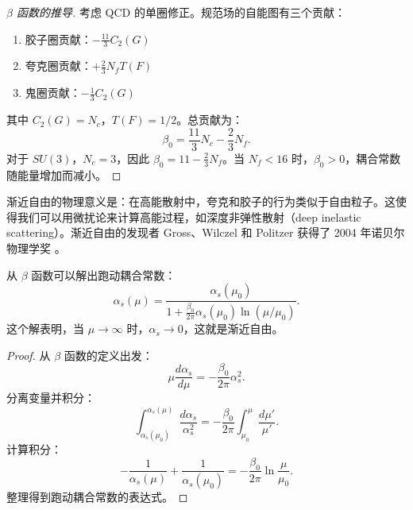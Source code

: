 \begin{proof}[$\beta$ 函数的推导]
考虑 QCD 的单圈修正。规范场的自能图有三个贡献：
\begin{enumerate}
    \item 胶子圈贡献：$-\frac{11}{3}C_2(G)$
    \item 夸克圈贡献：$+\frac{2}{3}N_f T(F)$
    \item 鬼圈贡献：$-\frac{1}{3}C_2(G)$
\end{enumerate}
其中 $C_2(G) = N_c$，$T(F) = 1/2$。总贡献为：
\begin{equation}
    \beta_0 = \frac{11}{3}N_c - \frac{2}{3}N_f.
\end{equation}
对于 $SU(3)$，$N_c = 3$，因此 $\beta_0 = 11 - \frac{2}{3}N_f$。当 $N_f < 16$ 时，$\beta_0 > 0$，耦合常数随能量增加而减小。
\end{proof}

\begin{remark}
渐近自由的物理意义是：在高能散射中，夸克和胶子的行为类似于自由粒子。这使得我们可以用微扰论来计算高能过程，如深度非弹性散射（deep inelastic scattering）。渐近自由的发现者 Gross、Wilczel 和 Politzer 获得了 2004 年诺贝尔物理学奖 \cite{Gross1973, Politzer1973}。
\end{remark}

\begin{proposition}[跑动耦合常数]
从 $\beta$ 函数可以解出跑动耦合常数：
\begin{equation}
    \alpha_s(\mu) = \frac{\alpha_s(\mu_0)}{1 + \frac{\beta_0}{2\pi}\alpha_s(\mu_0)\ln(\mu/\mu_0)}.
\end{equation}
这个解表明，当 $\mu \to \infty$ 时，$\alpha_s \to 0$，这就是渐近自由。
\end{proposition}

\begin{proof}
从 $\beta$ 函数的定义出发：
\begin{equation}
    \mu \frac{d\alpha_s}{d\mu} = -\frac{\beta_0}{2\pi} \alpha_s^2.
\end{equation}
分离变量并积分：
\begin{equation}
    \int_{\alpha_s(\mu_0)}^{\alpha_s(\mu)} \frac{d\alpha_s}{\alpha_s^2} = -\frac{\beta_0}{2\pi} \int_{\mu_0}^{\mu} \frac{d\mu'}{\mu'}.
\end{equation}
计算积分：
\begin{equation}
    -\frac{1}{\alpha_s(\mu)} + \frac{1}{\alpha_s(\mu_0)} = -\frac{\beta_0}{2\pi} \ln\frac{\mu}{\mu_0}.
\end{equation}
整理得到跑动耦合常数的表达式。
\end{proof}

